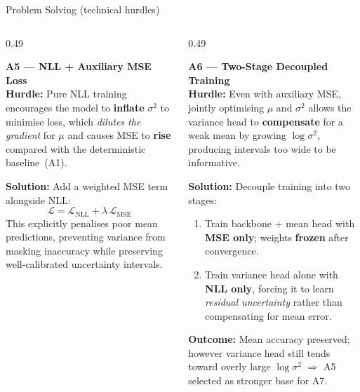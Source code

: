 \documentclass[10pt]{beamer}
\begin{document}
\begin{frame}[shrink=8]{Problem Solving (technical hurdles)}
\begin{columns}[t]

  \begin{column}{0.49\textwidth}

    \begin{block}{\footnotesize\textbf{A5 — NLL + Auxiliary MSE Loss}}
      \scriptsize
      ~\\
      \textbf{Hurdle:} Pure NLL training encourages the model to
      \textbf{inflate} $\sigma^2$ to minimise loss, which
      \emph{dilutes the gradient} for $\mu$ and causes
      MSE to \textbf{rise} compared with the deterministic baseline~(A1).
      \par\vspace{4pt}
      \textbf{Solution:} Add a weighted MSE term alongside NLL:
      \[
        \mathcal{L} = \mathcal{L}_{\text{NLL}} + \lambda\,\mathcal{L}_{\text{MSE}}
      \]
      This explicitly penalises poor mean predictions,
      preventing variance from masking inaccuracy while
      preserving well-calibrated uncertainty intervals.
    \end{block}

  \end{column}

  \begin{column}{0.49\textwidth}

    \begin{block}{\footnotesize\textbf{A6 — Two-Stage Decoupled Training}}
      \scriptsize
      ~\\
      \textbf{Hurdle:} Even with auxiliary MSE, jointly optimising
      $\mu$ and $\sigma^2$ allows the variance head to
      \textbf{compensate} for a weak mean by growing $\log\sigma^2$,
      producing intervals too wide to be informative.
      \par\vspace{4pt}
      \textbf{Solution:} Decouple training into two stages:
      \begin{enumerate}
        \item Train backbone + mean head with \textbf{MSE only};
              weights \textbf{frozen} after convergence.
        \item Train variance head alone with \textbf{NLL only},
              forcing it to learn \emph{residual uncertainty}
              rather than compensating for mean error.
      \end{enumerate}
      \textbf{Outcome:} Mean accuracy preserved; however variance
      head still tends toward overly large $\log\sigma^2$
      $\Rightarrow$ A5 selected as stronger base for A7.
    \end{block}

  \end{column}

\end{columns}
\end{frame}
\end{document}
